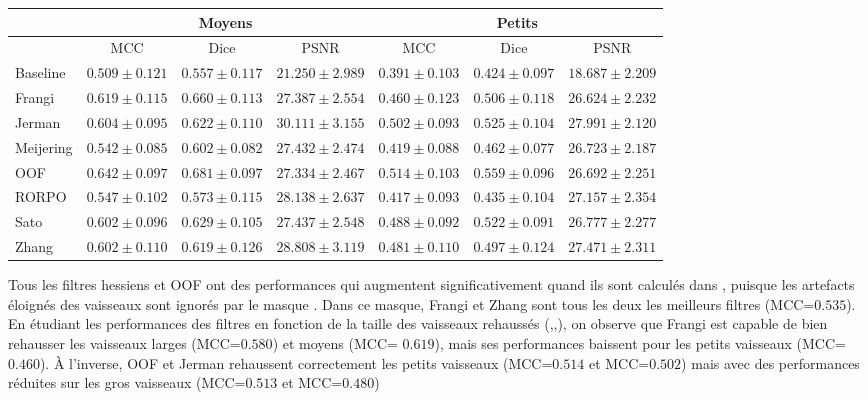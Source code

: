 \begin{table}[H]
\begin{center}
{\begin{tabular}{lccc|ccc}
                \hline
                & \multicolumn{3}{c}{Moyens}                                         & \multicolumn{3}{c}{Petits}                                            \\
                \hline
                & MCC  &  Dice & PSNR & MCC  &  Dice  &  PSNR  \\
                Baseline	& $ 0.509 \pm 0.121 $ & $	0.557 \pm 0.117 $ & $ 21.250 \pm 2.989 $ & $ 0.391 \pm	0.103 $ & $	0.424 \pm 0.097 $ & $ 18.687 \pm 2.209 $ \\
                Frangi    & $ 0.619 \pm 0.115 $ & $	0.660 \pm 0.113 $ & $ 27.387 \pm 2.554 $ & $ 0.460 \pm	0.123 $ & $	0.506 \pm 0.118 $ & $ 26.624 \pm 2.232 $ \\
                Jerman    & $ 0.604 \pm 0.095 $ & $	0.622 \pm 0.110 $ & $ 30.111 \pm 3.155 $ & $ 0.502 \pm	0.093 $ & $	0.525 \pm 0.104 $ & $ 27.991 \pm 2.120 $ \\
                Meijering & $ 0.542 \pm 0.085 $ & $	0.602 \pm 0.082 $ & $ 27.432 \pm 2.474 $ & $ 0.419 \pm	0.088 $ & $	0.462 \pm 0.077 $ & $ 26.723 \pm 2.187 $ \\
                OOF	    & $ 0.642 \pm 0.097 $ & $	0.681 \pm 0.097 $ & $ 27.334 \pm 2.467 $ & $ 0.514 \pm	0.103 $ & $	0.559 \pm 0.096 $ & $ 26.692 \pm 2.251 $ \\
                RORPO	    & $ 0.547 \pm 0.102 $ & $	0.573 \pm 0.115 $ & $ 28.138 \pm 2.637 $ & $ 0.417 \pm	0.093 $ & $	0.435 \pm 0.104 $ & $ 27.157 \pm 2.354 $ \\
                Sato	    & $ 0.602 \pm 0.096 $ & $	0.629 \pm 0.105 $ & $ 27.437 \pm 2.548 $ & $ 0.488 \pm	0.092 $ & $	0.522 \pm 0.091 $ & $ 26.777 \pm 2.277 $ \\
                Zhang	    & $ 0.602 \pm 0.110 $ & $	0.619 \pm 0.126 $ & $ 28.808 \pm 3.119 $ & $ 0.481 \pm	0.110 $ & $	0.497 \pm 0.124 $ & $ 27.471 \pm 2.311 $ \\        
      \hline
      \end{tabular}

  }
  \end{center}
\end{table}


Tous les filtres hessiens et OOF ont des performances qui augmentent significativement quand ils sont calculés dans \maskvessel, puisque les artefacts éloignés des vaisseaux sont ignorés par le masque \maskvessel. Dans ce masque, Frangi et Zhang sont tous les deux les meilleurs filtres (MCC=$0.535$). En étudiant les performances des filtres en fonction de la taille des vaisseaux rehaussés (\maskvesselLarge,\maskvesselMedium,\maskvesselSmall), on observe que Frangi est capable de bien rehausser les vaisseaux larges (MCC=$0.580$) et moyens (MCC= $0.619$), mais ses performances baissent pour les petits vaisseaux (MCC=$0.460$). À l'inverse, OOF et Jerman rehaussent correctement les petits vaisseaux (MCC=$0.514$ et MCC=$0.502$) mais avec des performances réduites sur les gros vaisseaux (MCC=$0.513$ et MCC=$0.480$)   


